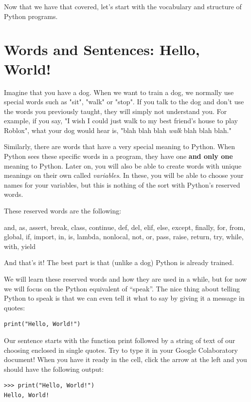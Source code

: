 Now that we have that covered, let's start with the vocabulary and structure of Python programs.

\section{Words and Sentences: Hello, World!}
Imagine that you have a dog. When we want to train a dog, we normally use special words such as "sit", "walk" or "stop". If you talk to the dog and don't use the words you previously taught, they will simply not understand you. For example, if you say, "I wish I could just walk to my best friend's house to play Roblox", what your dog would hear is, "blah blah blah \textit{walk} blah blah blah." 

Similarly, there are words that have a very special meaning to Python. When Python sees these specific words in a program, they have one \textbf{and only one} meaning to Python. Later on, you will also be able to create words with unique meanings on their own called \textit{variables}. In these, you will be able to choose your names for your variables, but this is nothing of the sort with Python's reserved words. 

These reserved words are the following:

\begin{minipage}{\linewidth}
    \begin{spverbatim}
      and, as, assert, break, class, continue, def, del, elif, else, except, finally, for, from, global, if, import, in, is, lambda, nonlocal, not, or, pass, raise, return, try, while, with, yield
    \end{spverbatim}
\end{minipage}

And that's it! The best part is that (unlike a dog) Python is already trained. 

We will learn these reserved words and how they are used in a while, but for now we will focus on the Python equivalent of “speak”. The nice thing about telling Python to speak is that we can even tell it what to say by giving it a message in quotes:

\begin{verbatim}
print("Hello, World!")
\end{verbatim}

Our sentence starts with the function print followed by a string of text of our choosing enclosed in single quotes. Try to type it in your Google Colaboratory document! When you have it ready in the cell, click the arrow at the left and you should have the following output:
 \begin{verbatim}
>>> print("Hello, World!")
Hello, World!
 \end{verbatim}

